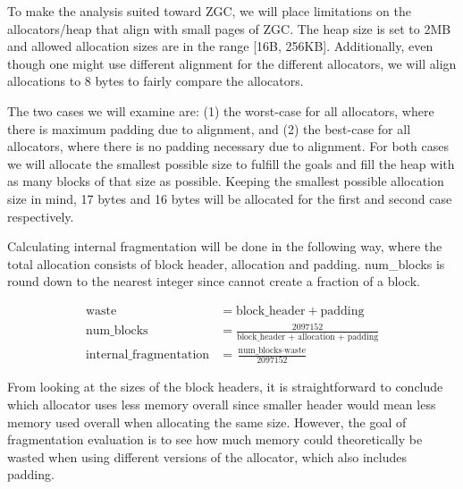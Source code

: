 To make the analysis suited toward ZGC, we will place limitations on the allocators/heap that align with small pages of ZGC. The heap size is set to 2MB and allowed allocation sizes are in the range [16B, 256KB]. Additionally, even though one might use different alignment for the different allocators, we will align allocations to 8 bytes to fairly compare the allocators.

The two cases we will examine are: (1) the worst-case for all allocators, where there is maximum padding due to alignment, and (2) the best-case for all allocators, where there is no padding necessary due to alignment. For both cases we will allocate the smallest possible size to fulfill the goals and fill the heap with as many blocks of that size as possible. Keeping the smallest possible allocation size in mind, 17 bytes and 16 bytes will be allocated for the first and second case respectively.

Calculating internal fragmentation will be done in the following way, where the total allocation consists of block header, allocation and padding. num\_blocks is round down to the nearest integer since cannot create a fraction of a block.

\begin{align}
    \text{waste} &= \text{block\_header} + \text{padding} \\
    \text{num\_blocks} &= \frac{2097152}{\text{block\_header + allocation + padding}} \\
    \text{internal\_fragmentation} &= \frac{\text{num\_blocks} \cdot \text{waste}}{2097152}
\end{align}

From looking at the sizes of the block headers, it is straightforward to conclude which allocator uses less memory overall since smaller header would mean less memory used overall when allocating the same size. However, the goal of fragmentation evaluation is to see how much memory could theoretically be wasted when using different versions of the allocator, which also includes padding.


